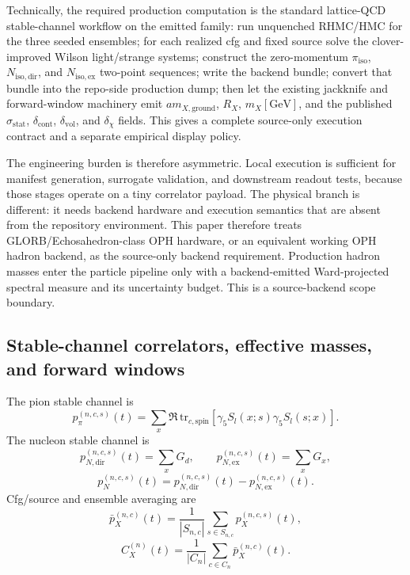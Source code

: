 \documentclass[11pt]{article}
\begin{document}
Technically, the required production computation is the standard lattice-QCD stable-channel
workflow on the emitted family: run unquenched RHMC/HMC for the three seeded ensembles; for each
realized cfg and fixed source solve the clover-improved Wilson light/strange systems; construct the
zero-momentum \(\pi_{\mathrm{iso}}\), \(N_{\mathrm{iso,dir}}\), and \(N_{\mathrm{iso,ex}}\)
two-point sequences; write the backend bundle; convert that bundle into the repo-side production
dump; then let the existing jackknife and forward-window machinery emit
\(a m_{X,\mathrm{ground}}\), \(R_X\), \(m_X[\mathrm{GeV}]\), and the published
\(\sigma_{\mathrm{stat}}\), \(\delta_{\mathrm{cont}}\), \(\delta_{\mathrm{vol}}\), and
\(\delta_{\chi}\) fields. This gives a complete source-only execution contract and a separate
empirical display policy.

The engineering burden is therefore asymmetric. Local execution is sufficient for manifest
generation, surrogate validation, and downstream readout tests, because those stages operate on a
tiny correlator payload. The physical branch is different: it needs backend hardware and execution
semantics that are absent from the repository environment. This paper therefore treats
GLORB/Echosahedron-class OPH hardware, or an equivalent working OPH hadron backend, as the
source-only backend requirement. Production hadron masses enter the particle pipeline only with a
backend-emitted Ward-projected spectral measure and its uncertainty budget. This is a
source-backend scope boundary.

\subsection{Stable-channel correlators, effective masses, and forward windows}

The pion stable channel is
\[
p_\pi^{(n,c,s)}(t)
=
\sum_x \Re\,\mathrm{tr}_{c,\mathrm{spin}}
\left[
\gamma_5 S_l(x;s)\gamma_5 S_l(s;x)
\right].
\]
The nucleon stable channel is
\[
p_{N,\mathrm{dir}}^{(n,c,s)}(t) = \sum_x G_d,
\qquad
p_{N,\mathrm{ex}}^{(n,c,s)}(t) = \sum_x G_x,
\]
\[
p_N^{(n,c,s)}(t)
=
p_{N,\mathrm{dir}}^{(n,c,s)}(t) - p_{N,\mathrm{ex}}^{(n,c,s)}(t).
\]
Cfg/source and ensemble averaging are
\[
\bar p_X^{(n,c)}(t)
=
\frac{1}{|S_{n,c}|}\sum_{s\in S_{n,c}} p_X^{(n,c,s)}(t),
\]
\[
C_X^{(n)}(t)
=
\frac{1}{|C_n|}\sum_{c\in C_n} \bar p_X^{(n,c)}(t).
\]
\end{document}
